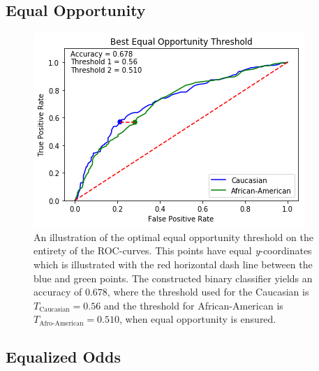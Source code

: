 \documentclass[11pt, fleqn, titlepage]{article}
\begin{document}
%
	

		
	\subsection{Equal Opportunity}\label{equalOpportunity}
	
	\begin{figure}[H]
		\centering
		\includegraphics[width=0.5\linewidth]{"imgs/Equal Opportunity Optimal"}
		\caption{An illustration of the optimal equal opportunity threshold on the entirety of the ROC-curves. This points have equal \textit{y}-coordinates which is illustrated with the red horizontal dash line between the blue and green points. The constructed binary classifier yields an accuracy of $ 0.678 $, where the threshold used for the Caucasian is $T_{\text{Caucasian}}= 0.56 $ and the threshold for African-American is $ T_{\text{Afro-American}}=0.510 $, when equal opportunity is ensured.}
		\label{fig:equal-opportunity-optimal}
	\end{figure}
	
	\subsection{Equalized Odds}\label{equalizedOdds}
	
\end{document}
